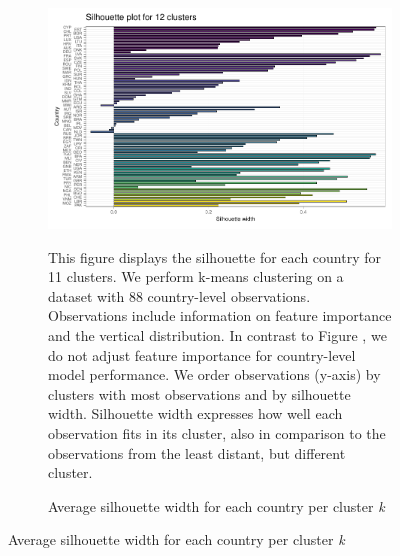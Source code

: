  \begin{figure}[ht!]\ContinuedFloat
   \centering
   \begin{subfigure}[b]{\textwidth}
   \centering
   \caption{Average silhouette width for each country per cluster \textit{k}} \label{fig:G2_silhouette}
   \includegraphics{Figures_Appendix/Figure_Silhouette_Clusters_1.pdf}
   \begin{subcaption2}
     This figure displays the silhouette for each country for 11 clusters. We perform k-means clustering on a dataset with 88 country-level observations. Observations include information on feature importance and the vertical distribution. In contrast to Figure , we do not adjust feature importance for country-level model performance. We order observations (y-axis) by clusters with most observations and by silhouette width. Silhouette width expresses how well each observation fits in its cluster, also in comparison to the observations from the least distant, but different cluster.
   \end{subcaption2}
   \end{subfigure}
 \end{figure}
 \clearpage

